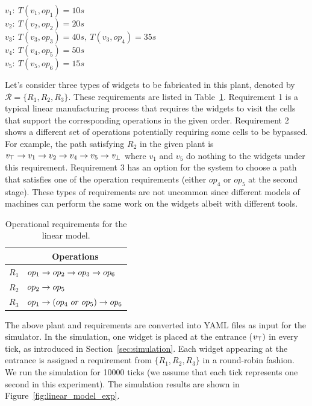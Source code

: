 \begingroup
\setlength\parindent{24pt}
\indent $v_1 \colon \ T(v_1,op_1)=10s$\\
\indent $v_2 \colon \ T(v_2,op_2)=20s$\\
\indent $v_3 \colon \ T(v_3,op_3)=40s,\ T(v_3,op_4)=35s$\\
\indent $v_4 \colon \ T(v_4,op_5)=50s$\\
\indent $v_5 \colon \ T(v_5,op_6)=15s$\\
\endgroup





Let's consider three types of widgets to be fabricated in this plant, denoted by $\mathcal{R}=\{R_1,R_2,R_3\}$.
These requirements are listed in Table~\ref{tab:linear_plant_requirements}.
Requirement 1 is a typical linear manufacturing process that requires the widgets to visit the cells that support the corresponding operations in the given order.
Requirement 2 shows a different set of operations potentially requiring some cells to be bypassed.
For example, the path satisfying $R_2$ in the given plant is $\mathit{v}_\top \rightarrow v_1 \rightarrow v_2 \rightarrow v_4 \rightarrow v_5 \rightarrow \mathit{v}_\bot$ where $v_1$ and $v_5$ do nothing to the widgets under this requirement.
Requirement 3 has an option for the system to choose a path that satisfies one of the operation requirements (\ie either $op_4$ or $op_5$ at the second stage).
These types of requirements are not uncommon since different models of machines can perform the same work on the widgets albeit with different tools.

\begin{table}[t]
\centering
\caption{Operational requirements for the linear model.}
\label{tab:linear_plant_requirements}
\begin{tabular}{|c|l|}
\hline
 & \multicolumn{1}{c|}{Operations}            \\ \hline \hline
$R_1$         & $op_1 \rightarrow op_2 \rightarrow op_3 \rightarrow op_6$ \\ \hline
$R_2$         & $op_2 \rightarrow op_5$  \\ \hline
$R_3$         & $op_1 \ra (op_4\ or\ op_5) \ra op_6$  \\ \hline
\end{tabular}
\end{table} 



The above plant and requirements are converted into YAML files as input for the simulator.
In the simulation, one widget is placed at the entrance (\ie $\mathit{v}_\top)$ in every tick, as introduced in Section~\ref{sec:simulation}. 
Each widget appearing at the entrance is assigned a requirement from $\{R_1, R_2, R_3\}$ in a round-robin fashion. 
We run the simulation for 10000 ticks (we assume that each tick represents one second in this experiment).
The simulation results are shown in Figure~\ref{fig:linear_model_exp}.%


